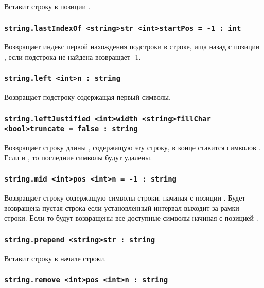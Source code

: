 \documentclass[a4paper, 14pt]{extarticle}
\begin{document}
Вставит строку  в позиции .

\subsubsection{\lstinline|string.lastIndexOf <string>str <int>startPos = -1 : int|}

Возвращает индекс первой нахождения подстроки  в строке, ища назад с позиции , если подстрока не найдена возвращает -1.

\subsubsection{\lstinline|string.left <int>n : string|}

Возвращает подстроку содержащая первый  символы.

\subsubsection{\lstinline|string.leftJustified <int>width <string>fillChar <bool>truncate = false : string|}

Возвращает строку длины , содержащую эту строку, в конце ставится  символов . Если  и , то последние  символы будут удалены.

\subsubsection{\lstinline|string.mid <int>pos <int>n = -1 : string|}

Возвращает строку содержащую  символы строки, начиная с позиции . Будет возвращена пустая строка если установленный интервал выходит за рамки строки. Если  то будут возвращены все доступные символы начиная с позицией .

\subsubsection{\lstinline|string.prepend <string>str : string|}

Вставит строку  в начале строки.

\subsubsection{\lstinline|string.remove <int>pos <int>n : string|}
\end{document}
